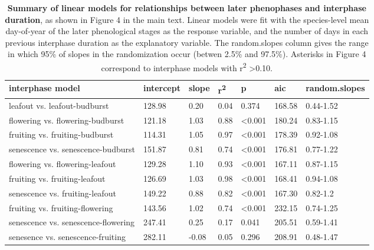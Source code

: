 \documentclass{article}
\begin{document}
\begin{table}[ht]
\centering
\caption{\textbf{Summary of linear models for relationships between later phenophases and interphase duration}, as shown in Figure 4 in the main text. Linear models were fit with the species-level mean day-of-year of the later phenological stages as the response variable, and the number of days in each previous interphase duration as the explanatory variable. The random.slopes column gives the range in which 95\% of slopes in the randomization occur (betwen 2.5\% and 97.5\%). Asterisks in Figure 4 correspond to interphase models with r\textsuperscript{2} >0.10.} 
\label{table:interphase}
\begin{tabular}{|p{}|p{}|p{}|p{}|p{}|p{}|p{}|}
  \hline
interphase model & intercept & slope & r\textsuperscript{2} & p & aic & random.slopes \\ 
  \hline
leafout vs. leafout-budburst & 128.98 & 0.20 & 0.04 & 0.374 & 168.58 & 0.44-1.52 \\ 
  flowering vs. flowering-budburst & 121.18 & 1.03 & 0.88 & <0.001 & 180.24 & 0.83-1.15 \\ 
  fruiting vs. fruiting-budburst & 114.31 & 1.05 & 0.97 & <0.001 & 178.39 & 0.92-1.08 \\ 
  senescence vs. senescence-budburst & 151.87 & 0.81 & 0.74 & <0.001 & 176.81 & 0.77-1.22 \\ 
  flowering vs. flowering-leafout & 129.28 & 1.10 & 0.93 & <0.001 & 167.11 & 0.87-1.15 \\ 
  fruiting vs. fruiting-leafout & 126.69 & 1.03 & 0.98 & <0.001 & 168.41 & 0.94-1.08 \\ 
  senescence vs. fruiting-leafout & 149.22 & 0.88 & 0.82 & <0.001 & 167.30 & 0.82-1.2 \\ 
  fruiting vs. fruiting-flowering & 143.56 & 1.02 & 0.74 & <0.001 & 232.15 & 0.74-1.25 \\ 
  senescence vs. senescence-flowering & 247.41 & 0.25 & 0.17 & 0.041 & 205.51 & 0.59-1.41 \\ 
  senesence vs. senescence-fruiting & 282.11 & -0.08 & 0.05 & 0.296 & 208.91 & 0.48-1.47 \\ 
   \hline
\end{tabular}
\end{table}
\end{document}
